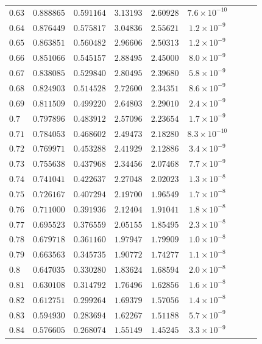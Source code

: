 \documentclass[12pt]{extarticle}
\theoremstyle{plain}
\theoremstyle{remark}
\begin{document}
\begin{longtable}{lcccccccc}
$0.63$ & $0.888865$ & $0.591164$ & $3.13193$ & $2.60928$ & $7.6\times10^{-10}$ \\
$0.64$ & $0.876449$ & $0.575817$ & $3.04836$ & $2.55621$ & $1.2\times10^{-9}$ \\
$0.65$ & $0.863851$ & $0.560482$ & $2.96606$ & $2.50313$ & $1.2\times10^{-9}$ \\
$0.66$ & $0.851066$ & $0.545157$ & $2.88495$ & $2.45000$ & $8.0\times10^{-9}$ \\
$0.67$ & $0.838085$ & $0.529840$ & $2.80495$ & $2.39680$ & $5.8\times10^{-9}$ \\
$0.68$ & $0.824903$ & $0.514528$ & $2.72600$ & $2.34351$ & $8.6\times10^{-9}$ \\
$0.69$ & $0.811509$ & $0.499220$ & $2.64803$ & $2.29010$ & $2.4\times10^{-9}$ \\
$0.7$ & $0.797896$ & $0.483912$ & $2.57096$ & $2.23654$ & $1.7\times10^{-9}$ \\
$0.71$ & $0.784053$ & $0.468602$ & $2.49473$ & $2.18280$ & $8.3\times10^{-10}$ \\
$0.72$ & $0.769971$ & $0.453288$ & $2.41929$ & $2.12886$ & $3.4\times10^{-9}$ \\
$0.73$ & $0.755638$ & $0.437968$ & $2.34456$ & $2.07468$ & $7.7\times10^{-9}$ \\
$0.74$ & $0.741041$ & $0.422637$ & $2.27048$ & $2.02023$ & $1.3\times10^{-8}$ \\
$0.75$ & $0.726167$ & $0.407294$ & $2.19700$ & $1.96549$ & $1.7\times10^{-8}$ \\
$0.76$ & $0.711000$ & $0.391936$ & $2.12404$ & $1.91041$ & $1.8\times10^{-8}$ \\
$0.77$ & $0.695523$ & $0.376559$ & $2.05155$ & $1.85495$ & $2.3\times10^{-8}$ \\
$0.78$ & $0.679718$ & $0.361160$ & $1.97947$ & $1.79909$ & $1.0\times10^{-8}$ \\
$0.79$ & $0.663563$ & $0.345735$ & $1.90772$ & $1.74277$ & $1.1\times10^{-8}$ \\
$0.8$ & $0.647035$ & $0.330280$ & $1.83624$ & $1.68594$ & $2.0\times10^{-8}$ \\
$0.81$ & $0.630108$ & $0.314792$ & $1.76496$ & $1.62856$ & $1.6\times10^{-8}$ \\
$0.82$ & $0.612751$ & $0.299264$ & $1.69379$ & $1.57056$ & $1.4\times10^{-8}$ \\
$0.83$ & $0.594930$ & $0.283694$ & $1.62267$ & $1.51188$ & $5.7\times10^{-9}$ \\
$0.84$ & $0.576605$ & $0.268074$ & $1.55149$ & $1.45245$ & $3.3\times10^{-9}$ \\

\end{longtable}
\end{document}

